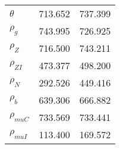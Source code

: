 \begin{center}
\begin{longtable}{lcc}
$ {\theta}             $	 & 	     713.652	 & 	     737.399 \\ 
$ {\rho_g}             $	 & 	     743.995	 & 	     726.925 \\ 
$ {\rho_Z}             $	 & 	     716.500	 & 	     743.211 \\ 
$ {\rho_{ZI}}          $	 & 	     473.377	 & 	     498.200 \\ 
$ {\rho_N}             $	 & 	     292.526	 & 	     449.416 \\ 
$ {\rho_b}             $	 & 	     639.306	 & 	     666.882 \\ 
$ {\rho_{muC}}         $	 & 	     733.569	 & 	     733.441 \\ 
$ {\rho_{muI}}         $	 & 	     113.400	 & 	     169.572 \\ 
\end{longtable}
 \end{center}
